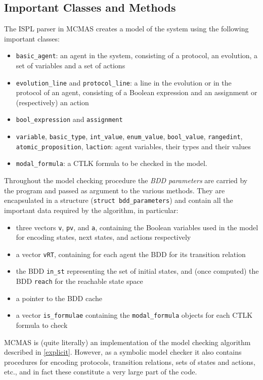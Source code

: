 \documentclass[11pt]{report}
\begin{document}
\subsection{Important Classes and Methods}
\label{MCMAS_steps}
The ISPL parser in MCMAS creates a model of the system using the following important classes: 
\begin{itemize}
\item \texttt{basic\_agent}: an agent in the system, consisting of a protocol, an evolution, a set of variables and a set of actions
\item \texttt{evolution\_line} and \texttt{protocol\_line}: a line in the evolution or in the protocol of an agent, consisting of a Boolean expression and an assignment or (respectively) an action
\item \texttt{bool\_expression} and \texttt{assignment}
\item \texttt{variable}, \texttt{basic\_type}, \texttt{int\_value}, \texttt{enum\_value}, \texttt{bool\_value},  \texttt{rangedint}, \texttt{atomic\_proposition}, \texttt{laction}: agent variables, their types and their values
\item \texttt{modal\_formula}: a CTLK formula to be checked in the model.
\end{itemize}
Throughout the model checking procedure the \textit{BDD parameters} are carried by the program and passed as argument to the various methods. They are encapsulated in a structure (\texttt{struct bdd\_parameters}) and contain all the important data required by the algorithm, in particular: 
\begin{itemize}
\item three vectors \texttt{v}, \texttt{pv}, and \texttt{a}, containing the Boolean variables used in the model for encoding states, next states, and actions respectively
\item a vector \texttt{vRT}, containing for each agent the BDD for its transition relation 
\item the BDD \texttt{in\_st} representing the set of initial states, and (once computed) the BDD \texttt{reach} for the reachable state space
\item a pointer to the BDD cache
\item a vector \texttt{is\_formulae} containing the \texttt{modal\_formula} objects for each CTLK formula to check
\end{itemize}
MCMAS is (quite literally) an implementation of the model checking algorithm described in \ref{explicit}. However, as a symbolic model checker it also contains procedures for encoding protocols, transition relations, sets of states and actions, etc., and in fact these constitute a very large part of the code. 
\end{document}
